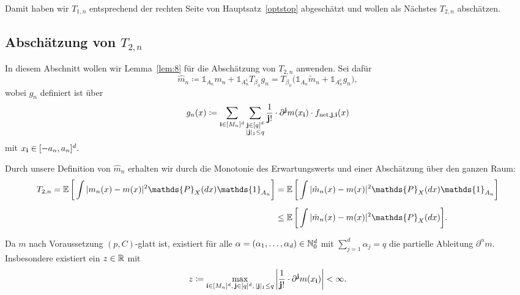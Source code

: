 Damit haben wir $T_{1,n}$ entsprechend der rechten Seite von Hauptsatz~\ref{optstop} abgeschätzt und wollen als Nächstes $T_{2,n}$ abschätzen.

\subsection{Abschätzung von $T_{2,n}$}

In diesem Abschnitt wollen wir Lemma~\ref{lem:8} für die Abschätzung von $T_{2,n}$ anwenden.
Sei dafür $$\hat{m}_n \coloneqq \mathds{1}_{A_n}m_n + \mathds{1}_{A_n^{\mathsf{c}}}T_{\beta_n}g_n = T_{\beta_n}\big(\mathds{1}_{A_n}\tilde{m}_n + \mathds{1}_{A_n^{\mathsf{c}}}g_n \big),$$
wobei $g_n$ definiert ist über
$$g_n(x) \coloneqq \sum_{\mathbf{i} \in [M_n]^d} \sum_{\substack{ \mathbf{j} \in [q]^d \\ |\mathbf{j}|_1 \leq q}} \frac{1}{\mathbf{j}!} \cdot \partial^{\mathbf{j}}m(x_{\mathbf{i}}) \cdot f_{\mathrm{net},\mathbf{j},\mathbf{i}}(x)$$
mit $x_{\mathbf{i}} \in [-a_n,a_n]^d.$

Durch unsere Definition von $\hat{m}_n$ erhalten wir durch die Monotonie des Erwartungswerts und einer Abschätzung über den ganzen Raum:
\begin{equation}
\label{an}
\begin{split}
T_{2,n} = \E \bigg[\int |m_n(x) - m(x)|^2 \mathds{P}_X(dx) \mathds{1}_{A_n}\bigg] & = \E \bigg[\int |\hat{m}_n(x) - m(x)|^2 \mathds{P}_X(dx) \mathds{1}_{A_n}\bigg] \\[0.5em]
& \leq \E \bigg[\int |\hat{m}_n(x) - m(x)|^2 \mathds{P}_X(dx)\bigg].
\end{split}
\end{equation}

Da $m$ nach Voraussetzung $(p,C)$-glatt ist, existiert für alle $\alpha = (\alpha_1,\dots,\alpha_d) \in \mathbb{N}_0^d$ mit $\sum_{j = 1}^d\alpha_j = q$ die partielle Ableitung $\partial^{\alpha}m$. Insbesondere existiert ein $z \in \mathbb{R}$ mit
\begin{equation}
\label{bound}
z \coloneqq \max_{\mathbf{i} \in [M_n]^d,\, \mathbf{j} \in [q]^d,\, |\mathbf{j}|_1 \leq q} \bigg|\frac{1}{\mathbf{j}!} \cdot \partial^{\mathbf{j}}m(x_{\mathbf{i}})\bigg| < \infty.
\end{equation}

